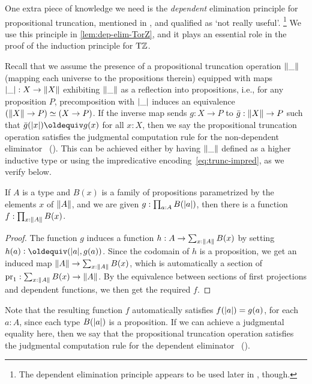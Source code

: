 \documentclass[a4paper,12pt]{amsart}
\begin{document}
One extra piece of knowledge we need is the \emph{dependent} elimination
principle for propositional truncation, mentioned in \cite[6.9]{hottbook},
and qualified as `not really useful'.%
\footnote{The dependent elimination principle appears to
  be used later in \cite[Lemma 7.3.3]{hottbook}, though.
}
We use this principle in \cref{lem:dep-elim-TorZ}, and it plays an
essential role in the proof of the induction principle for ${\mathrm{T}\mathbb{Z}}$.

Recall that we assume the presence of a propositional truncation operation
$\lVert\_\rVert$ (mapping each universe to the propositions therein) equipped with
maps $\lvert\_\rvert : X \to \lVert X\rVert$ exhibiting $\lVert\_\rVert$ as a reflection into
propositions, i.e., for any proposition $P$, precomposition with $\lvert\_\rvert$
induces an equivalence $(\lVert X\rVert\to P) \simeq (X\to P)$.
If the inverse map sends $g:X\to P$ to $\bar g : \lVert X\rVert \to P$
such that $\bar g(\trunc x) \jdeq g(x)$ for all $x:X$,
then we say the propositional truncation operation satisfies the
judgmental computation rule for the non-dependent eliminator~%
().
This can be achieved either by having $\lVert\_\rVert$ defined as a higher inductive type
or using the impredicative encoding~\eqref{eq:trunc-impred}, as we verify below.

\begin{lemma}\label{lem:proptruncind}
  If $A$ is a type and $B(x)$ is a family of propositions
  parametrized by the elements $x$ of $\lVert A\rVert$,
  and we are given $g : \prod_{a:A} B(\lvert a\rvert)$,
  then there is a function $f : \prod_{x:\lVert A\rVert} B(x)$.
\end{lemma}
\begin{proof}
  The function $g$ induces a function $h : A \to \sum_{x:\lVert A\rVert}B(x)$
  by setting $h(a) \defeq (\trunc a,g(a))$.
  Since the codomain of $h$ is a proposition,
  we get an induced map $\lVert A\rVert \to \sum_{x:\lVert A\rVert}B(x)$,
  which is automatically a section of $\operatorname{pr}_1 : \sum_{x:\lVert A\rVert}B(x) \to \lVert A\rVert$.
  By the equivalence between sections of first projections
  and dependent functions, we then get the required $f$.
\end{proof}
Note that the resulting function $f$ automatically satisfies
$f(\lvert a\rvert) = g(a)$, for each $a:A$,
since each type $B(\lvert a\rvert)$ is a proposition.
If we can achieve a judgmental equality here,
then we say that the propositional truncation operation satisfies the
judgmental computation rule for the dependent eliminator~%
().
\end{document}
